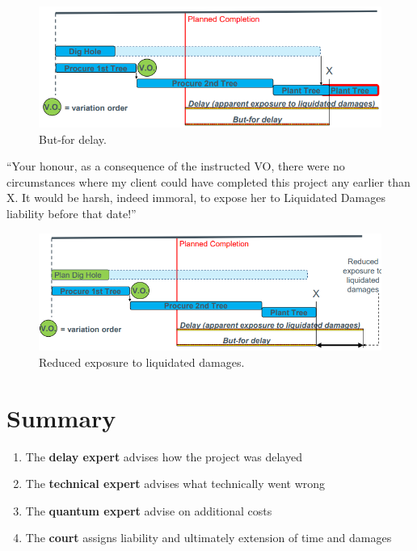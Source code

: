 \begin{figure}[H]
    \centering
    \includegraphics[width = \textwidth]{img/figure50.png}
    \caption{But-for delay.}
\end{figure}
\begin{quoting}
    ``Your honour, as a consequence of the instructed VO, there were no circumstances where my client could have completed this project any earlier than X. It would be harsh, indeed immoral, to expose her to Liquidated Damages liability before that date!''
\end{quoting}
\begin{figure}[H]
    \centering
    \includegraphics[width = \textwidth]{img/figure51.png}
    \caption{Reduced exposure to liquidated damages.}
\end{figure}
\section{Summary}
\begin{enumerate}
    \item The \textbf{delay expert} advises how the project was delayed
    \item The \textbf{technical expert} advises what technically went wrong
    \item The \textbf{quantum expert} advise on additional costs
    \item The \textbf{court} assigns liability and ultimately extension of time and damages
\end{enumerate}